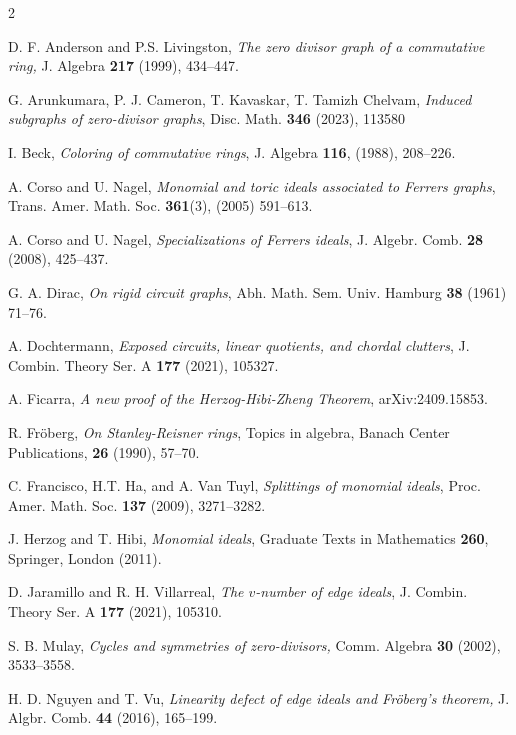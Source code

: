 \documentclass[12pt,amscd]{amsart}
\theoremstyle{definition}
\numberwithin{equation}{section}
\begin{document}
\begin{thebibliography}{2}



D. F. Anderson and P.S. Livingston, 
{\em The zero divisor graph of a commutative ring,} J. Algebra {\bf 217} (1999), 434--447.


G. Arunkumara, P. J. Cameron, T. Kavaskar, T. Tamizh Chelvam,
{\em Induced subgraphs of zero-divisor graphs}, Disc. Math. {\bf 346} (2023), 113580

 I. Beck,
 {\em Coloring of commutative rings}, J. Algebra {\bf 116}, (1988), 208--226.

 

 
 A. Corso and U. Nagel, \emph{Monomial and toric ideals associated to Ferrers graphs},  Trans. Amer. Math. Soc. {\bf 361}(3), (2005) 591--613.
 
 
 A. Corso and U. Nagel, \emph{Specializations of Ferrers ideals}, J. Algebr. Comb. {\bf 28} (2008), 425--437.
 
G. A. Dirac, 
{\em On rigid circuit graphs}, Abh. Math. Sem. Univ. Hamburg {\bf 38} (1961) 71--76.

 A. Dochtermann, \emph{Exposed circuits, linear quotients, and chordal clutters},  J. Combin. Theory Ser. A {\bf 177} (2021), 105327.
 
 

 A. Ficarra,
 {\em A new proof of the Herzog-Hibi-Zheng Theorem}, arXiv:2409.15853.
 
 R. Fr\"{o}berg,
 {\em On Stanley-Reisner rings}, 
 Topics in algebra, Banach Center Publications, {\bf 26} (1990), 57--70. 
 
C. Francisco, H.T. Ha, and A. Van Tuyl, 
{\it Splittings of monomial ideals}, Proc. Amer. Math. Soc. {\bf 137} (2009), 3271--3282.


J. Herzog and T. Hibi,
{\em Monomial ideals}, Graduate Texts in Mathematics {\bf 260}, Springer, London (2011).



D. Jaramillo and R. H. Villarreal,
{\it The $v$-number of edge ideals}, 
J. Combin. Theory Ser. A {\bf 177} (2021), 105310.

 
S. B. Mulay, 
{\it Cycles and symmetries of zero-divisors,} Comm. Algebra {\bf 30} (2002), 3533--3558.


H. D. Nguyen and T. Vu,
{\em Linearity defect of edge ideals and Fr\"oberg’s theorem,} 
	J. Algbr. Comb. {\bf 44} (2016), 165--199.



\end{thebibliography}
\end{document}
